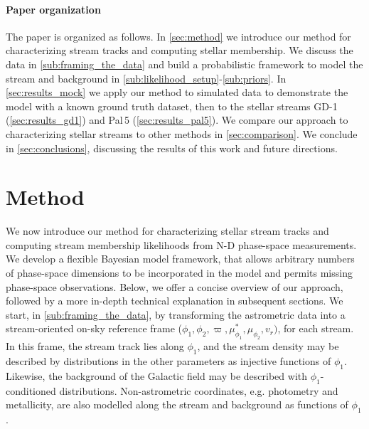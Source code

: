 \documentclass[twocolumn]{aastex631}
\newcommand{\stream}[1]{#1}
\newcommand{\parallax}{\varpi}
\begin{document}
    \paragraph{Paper organization}

        The paper is organized as follows.
        In \autoref{sec:method} we introduce our method for characterizing stream tracks and computing stellar membership.
        We discuss the data in \autoref{sub:framing_the_data} and build a probabilistic framework to model the stream and background in \autoref{sub:likelihood_setup}-\autoref{sub:priors}.
        In \autoref{sec:results_mock} we apply our method to simulated data to demonstrate the model with a known ground truth dataset,
        then to the stellar streams \stream{GD-1} (\autoref{sec:results_gd1}) and \stream{Pal\,5} (\autoref{sec:results_pal5}).
        We compare our approach to characterizing stellar streams to other methods in \autoref{sec:comparison}.
        We conclude in \autoref{sec:conclusions}, discussing the results of this work and future directions.


\section{Method} \label{sec:method}

    We now introduce our method for characterizing stellar stream tracks and computing stream membership likelihoods from N-D phase-space measurements.
    We develop a flexible Bayesian model framework, that allows arbitrary numbers of phase-space dimensions to be incorporated in the model and permits missing phase-space observations. 
    Below, we offer a concise overview of our approach, followed by a more in-depth technical explanation in subsequent sections.
    We start, in \autoref{sub:framing_the_data}, by transforming the astrometric data into
    a stream-oriented on-sky reference frame ($\phi_1, \phi_2, \parallax, \mu_{\phi_1}^*, \mu_{\phi_2}, v_r)$, for each stream. In this frame, 
    the stream track lies along $\phi_1$, and the stream density may be described by distributions in the other parameters as injective functions of $\phi_1$.
    Likewise, the background of the Galactic field may be described with $\phi_1$-conditioned distributions.
    Non-astrometric coordinates, e.g. photometry and metallicity, are also modelled along the stream and background as functions of $\phi_1$.
\end{document}
